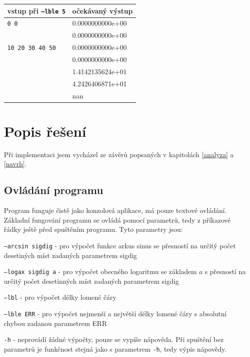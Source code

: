 \documentclass[12pt,a4paper,titlepage,final]{article}
\begin{document}
\vspace{1em}\begin{tabular}{ll} %
vstup při \texttt{--lble 5} & očekávaný výstup \\
\hline
\verb|0 0| & 0.0000000000e+00 \\
\verb||    & 0.0000000000e+00 \\
\verb|10 20 30 40 50| & 0.0000000000e+00 \\
\verb|| & 0.0000000000e+00 \\
\verb|| & 1.4142135624e+01 \\
\verb|| & 4.2426406871e+01 \\
\verb|| & nan \\
\end{tabular}

\newpage
\section{Popis řešení} \label{reseni}

Při implementaci jsem vycházel ze závěrů popsaných v kapitolách \ref{analyza} a
\ref{navrh}.

\subsection{Ovládání programu}\label{ovladani}

Program funguje čistě jako konzolová aplikace, má pouze textové ovládání.
Základní fungování programu se ovládá pomocí parametrů, tedy z příkazové řádky
ještě před spuštěním programu. Tyto parametry jsou:

\texttt{--arcsin sigdig} - pro výpočet funkce arkus sinus se přesností na
určitý počet desetiných míst zadaných parametrem sigdig

\texttt{--logax sigdig a} - pro výpočet obecného logaritmu se základem $a$
s přesností na určitý počet desetinných míst zadaných parametrem sigdig

\texttt{--lbl} - pro výpočet délky lomené čáry

\texttt{--lble ERR} - pro výpočet nejmenší a největší délky lomené čáry s
absolutní chybou zadanou parametrem ERR

\texttt{-h} - neprovádí žádné výpočty, pouze se vypíše nápověda.
Při spuštění bez parametrů je funkčnost stejná jako s parametrem
\texttt{-h}, tedy výpis nápovědy.
\end{document}
